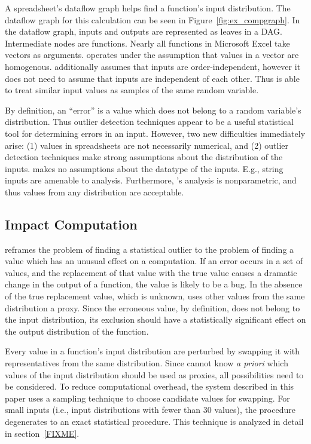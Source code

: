 {%
A spreadsheet's dataflow graph helps \checkcell{} find a function's input distribution.  The dataflow graph for this calculation can be seen in Figure~\ref{fig:ex_compgraph}.  In the dataflow graph, inputs and outputs are represented as leaves in a DAG.  Intermediate nodes are functions.  Nearly all functions in Microsoft Excel take vectors as arguments.  \checkcell{} operates under the assumption that values in a vector are homogenous.  \checkcell{} additionally assumes that inputs are order-independent, however it does not need to assume that inputs are independent of each other.  Thus \checkcell{} is able to treat similar input values as samples of the same random variable.

By definition, an ``error'' is a value which does not belong to a random variable's distribution.  Thus outlier detection techniques appear to be a useful statistical tool for determining errors in an input.  However, two new difficulties immediately arise: (1) values in spreadsheets are not necessarily numerical, and (2) outlier detection techniques make strong assumptions about the distribution of the inputs.  \checkcell{} makes no assumptions about the datatype of the inputs.  E.g., string inputs are amenable to analysis.  Furthermore, \checkcell{}'s analysis is nonparametric, and thus values from any distribution are acceptable.

\subsection{Impact Computation}

\checkcell{} reframes the problem of finding a statistical outlier to the problem of finding a value which has an unusual effect on a computation.  If an error occurs in a set of values, and the replacement of that value with the true value causes a dramatic change in the output of a function, the value is likely to be a bug.  In the absence of the true replacement value, which is unknown, \checkcell{} uses other values from the same distribution a proxy.  Since the erroneous value, by definition, does not belong to the input distribution, its exclusion should have a statistically significant effect on the output distribution of the function.

Every value in a function's input distribution are perturbed by swapping it with representatives from the same distribution.  Since \checkcell{} cannot know \emph{a priori} which values of the input distribution should be used as proxies, all possibilities need to be considered.  To reduce computational overhead, the system described in this paper uses a sampling technique to choose candidate values for swapping.  For small inputs (i.e., input distributions with fewer than 30 values), the procedure degenerates to an exact statistical procedure.  This technique is analyzed in detail in section~\ref{FIXME}.

}
